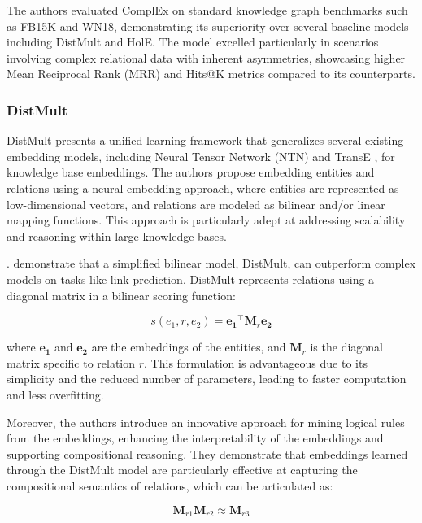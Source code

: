 \documentclass{article}
\begin{document}
\sloppy
The authors evaluated ComplEx on standard knowledge graph benchmarks such as FB15K and WN18, demonstrating its superiority over several baseline models including DistMult and HolE. The model excelled particularly in scenarios involving complex relational data with inherent asymmetries, showcasing higher Mean Reciprocal Rank (MRR) and Hits@K metrics compared to its counterparts.
\sloppy

\subsubsection{DistMult}
DistMult \textcite{yang2015embedding} presents a unified learning framework that generalizes several existing embedding models, including Neural Tensor Network (NTN) and TransE \textcite{bordes2013translating}, for knowledge base embeddings. The authors propose embedding entities and relations using a neural-embedding approach, where entities are represented as low-dimensional vectors, and relations are modeled as bilinear and/or linear mapping functions. This approach is particularly adept at addressing scalability and reasoning within large knowledge bases.

\textcite{yang2015embedding}. demonstrate that a simplified bilinear model, DistMult, can outperform complex models on tasks like link prediction. DistMult represents relations using a diagonal matrix in a bilinear scoring function:

\begin{equation}
s(e_1, r, e_2) = \mathbf{e_1}^\top \mathbf{M}_r \mathbf{e_2}
\end{equation}

where $\mathbf{e_1}$ and $\mathbf{e_2}$ are the embeddings of the entities, and $\mathbf{M}_r$ is the diagonal matrix specific to relation $r$. This formulation is advantageous due to its simplicity and the reduced number of parameters, leading to faster computation and less overfitting.

Moreover, the authors introduce an innovative approach for mining logical rules from the embeddings, enhancing the interpretability of the embeddings and supporting compositional reasoning. They demonstrate that embeddings learned through the DistMult model are particularly effective at capturing the compositional semantics of relations, which can be articulated as:

\begin{equation}
\mathbf{M}_{r1} \mathbf{M}_{r2} \approx \mathbf{M}_{r3}
\end{equation}
\end{document}

